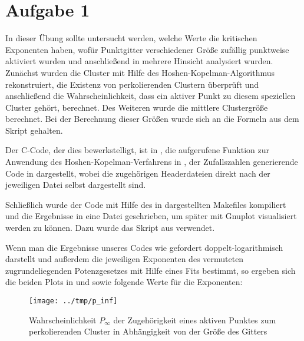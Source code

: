 \section*{Aufgabe 1}
In dieser Übung sollte untersucht werden, welche Werte die kritischen Exponenten
haben, wofür Punktgitter verschiedener Größe zufällig punktweise aktiviert wurden
und anschließend in mehrere Hinsicht analysiert wurden. Zunächst wurden die Cluster
mit Hilfe des Hoshen-Kopelman-Algorithmus rekonstruiert, die Existenz
von perkolierenden Clustern überprüft und anschließend die Wahrscheinlichkeit, dass
ein aktiver Punkt zu diesem speziellen Cluster gehört, berechnet. Des Weiteren
wurde die mittlere Clustergröße berechnet. Bei der Berechnung dieser Größen wurde
sich an die Formeln aus dem Skript gehalten.

Der C-Code, der dies bewerkstelligt, ist in , die aufgerufene
Funktion zur Anwendung des Hoshen-Kopelman-Verfahrens in , der Zufallszahlen
generierende Code in  dargestellt, wobei die zugehörigen Headerdateien 
direkt nach der jeweiligen Datei selbst dargestellt sind.




% 


Schließlich wurde der Code mit Hilfe des in  dargestellten Makefiles
kompiliert und die Ergebnisse in eine Datei geschrieben, um später mit Gnuplot
visualisiert werden zu können. Dazu wurde das Skript aus  verwendet.




Wenn man die Ergebnisse unseres Codes wie gefordert doppelt-logarithmisch darstellt
und außerdem die jeweiligen Exponenten des vermuteten zugrundeliegenden Potenzgesetzes
mit Hilfe eines Fits bestimmt, so ergeben sich die beiden Plots in  und
 sowie folgende Werte für die Exponenten:

\begin{figure}[htb]
  \centering
  \texttt{[image: ../tmp/p\_inf]}
  \caption{Wahrscheinlichkeit $P_{\infty}$ der Zugehörigkeit eines aktiven Punktes zum perkolierenden Cluster in Abhängigkeit von der Größe des Gitters}
  \label{fig:P}
\end{figure}

